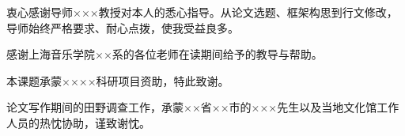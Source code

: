 

\begin{acknowledgements}
  衷心感谢导师×××教授对本人的悉心指导。从论文选题、框架构思到行文修改，导师始终严格要求、耐心点拨，使我受益良多。

  感谢上海音乐学院××系的各位老师在读期间给予的教导与帮助。

  本课题承蒙××××科研项目资助，特此致谢。

  论文写作期间的田野调查工作，承蒙××省××市的×××先生以及当地文化馆工作人员的热忱协助，谨致谢忱。
\end{acknowledgements}
